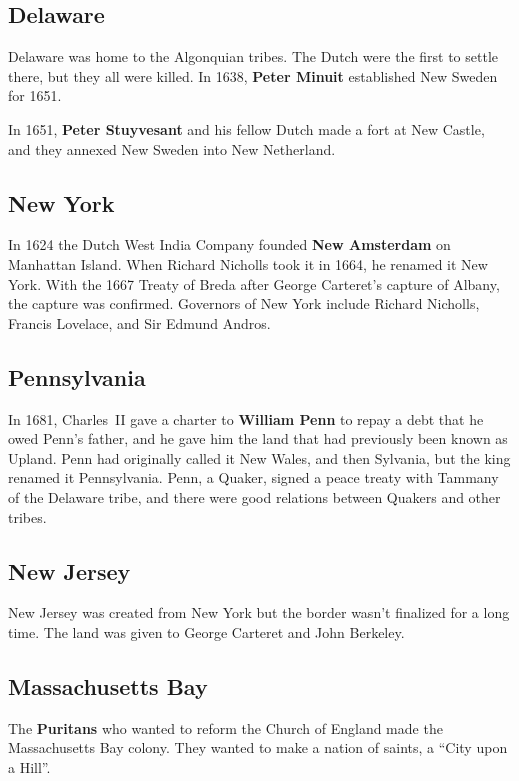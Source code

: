 \subsection*{Delaware}

Delaware was home to the Algonquian tribes.
The Dutch were the first to settle there, but they all were killed.
In 1638, \textbf{Peter Minuit} established New Sweden for 1651.

In 1651, \textbf{Peter Stuyvesant} and his fellow Dutch made a fort at New Castle,
and they annexed New Sweden into New Netherland.

\subsection*{New York}

In 1624 the Dutch West India Company founded \textbf{New Amsterdam} on Manhattan Island.
When Richard Nicholls took it in 1664, he renamed it New York.
With the 1667 Treaty of Breda after George Carteret's capture of Albany,
the capture was confirmed.
Governors of New York include Richard Nicholls, Francis Lovelace, and Sir Edmund Andros.

\subsection*{Pennsylvania}

In 1681, Charles~II gave a charter to \textbf{William Penn} to repay a debt that he owed Penn's father,
and he gave him the land that had previously been known as Upland.
Penn had originally called it New Wales, and then Sylvania, but the king renamed it Pennsylvania.
Penn, a Quaker, signed a peace treaty with Tammany of the Delaware tribe,
and there were good relations between Quakers and other tribes.

\subsection*{New Jersey}

New Jersey was created from New York but the border wasn't finalized for a long time.
The land was given to George Carteret and John Berkeley.

\subsection*{Massachusetts Bay}

The \textbf{Puritans} who wanted to reform the Church of England made the Massachusetts Bay colony.
They wanted to make a nation of saints, a ``City upon a Hill''.

